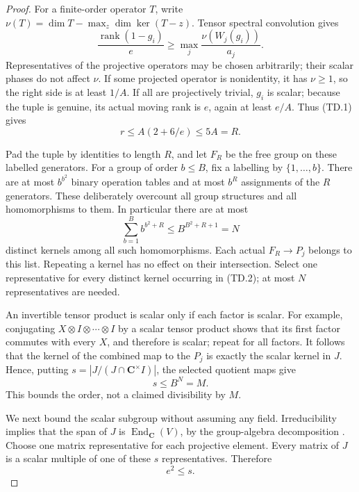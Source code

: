 \begin{proof}
For a finite-order operator \(T\), write
\(\nu(T)=\dim T-\max_z\dim\ker(T-z)\).
Tensor spectral convolution gives
\[
 \frac{\operatorname{rank}(1-g_i)}e
             \ge \max_j\frac{\nu(W_j(g_i))}{a_j}.
 \tag{TD.5}
\]
Representatives of the projective operators may be chosen arbitrarily;
their scalar phases do not affect \(\nu\).
If some projected operator is nonidentity, it has \(\nu\ge1\), so
the right side is at least \(1/A\).
If all are projectively trivial, \(g_i\) is scalar; because the tuple
is genuine, its actual moving rank is \(e\), again at least \(e/A\).
Thus (TD.1) gives
\[
                  r\le A(2+6/e)\le5A=R .
                  \tag{TD.6}
\]

Pad the tuple by identities to length \(R\), and let \(F_R\) be the
free group on these labelled generators.  For a group of order
\(b\le B\), fix a labelling by \(\{1,\ldots,b\}\).
There are at most \(b^{b^2}\) binary operation tables and at most
\(b^R\) assignments of the \(R\) generators.  These deliberately
overcount all group structures and all homomorphisms to them.
In particular there are at most
\[
          \sum_{b=1}^B b^{b^2+R}
                     \le B^{B^2+R+1}=N
                     \tag{TD.7}
\]
distinct kernels among all such homomorphisms.
Each actual \(F_R\longrightarrow P_j\) belongs to this list.
Repeating a kernel has no effect on their intersection.
Select one representative for every distinct kernel occurring in
(TD.2); at most \(N\) representatives are needed.

An invertible tensor product is scalar only if each factor is scalar.
For example, conjugating \(X\otimes I\otimes\cdots\otimes I\)
by a scalar tensor product shows that its first factor commutes
with every \(X\), and therefore is scalar; repeat for all factors.
It follows that the kernel of the combined map to the \(P_j\)
is exactly the scalar kernel in \(J\).  Hence, putting
\(s=|J/(J\cap\mathbf C^\times I)|\), the selected quotient maps give
\[
                              s\le B^N=M .
                              \tag{TD.8}
\]
This bounds the order, not a claimed divisibility by \(M\).

We next bound the scalar subgroup without assuming any field.
Irreducibility implies that the span of \(J\) is
\(\operatorname{End}_{\mathbf C}(V)\), by the group-algebra
decomposition \cite[\S6.2, Proposition10, p.~48]{OG:Serre1977}.
Choose one matrix representative for each projective element.
Every matrix of \(J\) is a scalar multiple of one of these \(s\)
representatives.  Therefore
\[
                                  e^2\le s.
                                  \tag{TD.9}
\]


\end{proof}
